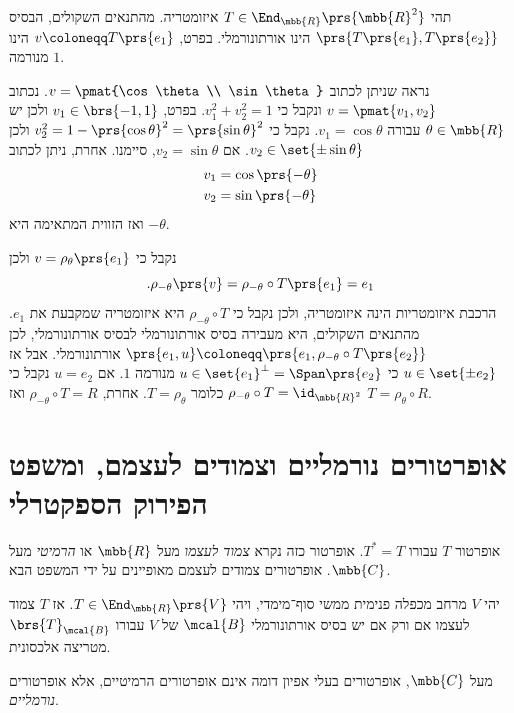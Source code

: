 \documentclass[a4paper,10pt,twoside,openany]{book}
\begin{document}
\begin{solution}
תהי
$T \in \End_{\mbb{R}}\prs{\mbb{R}^2}$
איזומטריה.
מהתנאים השקולים, הבסיס
$\prs{T\prs{e_1}, T\prs{e_2}}$
הינו אורתונורמלי.
בפרט,
$v \coloneqq T\prs{e_1}$
הינו מנורמה
$1$.

נראה שניתן לכתוב
$v = \pmat{\cos\theta \\ \sin\theta}$.
נכתוב
$v = \pmat{v_1, v_2}$
ונקבל כי
$v_1^2 + v_2^2 = 1$.
בפרט,
$v_1 \in \brs{-1,1}$
ולכן יש
$\theta \in \mbb{R}$
עבורה
$v_1 = \cos\theta$.
נקבל כי
$v_2^2 = 1 - \prs{\cos \theta}^2 = \prs{\sin \theta}^2$
ולכן
$v_2 \in \set{\pm \sin \theta}$.
אם
$v_2 = \sin\theta$,
סיימנו.
אחרת, ניתן לכתוב
\begin{align*}
    v_1 &= \cos\prs{-\theta} \\
    v_2 &= \sin\prs{-\theta}
\end{align*}
ואז הזווית המתאימה היא
$-\theta$.

נקבל כי
$v = \rho_\theta\prs{e_1}$
ולכן
\[\text{.} \rho_{-\theta}\prs{v} = \rho_{-\theta} \circ T \prs{e_1} = e_1\]
הרכבת איזומטריות הינה איזומטריה, ולכן נקבל כי
$\rho_{-\theta} \circ T$
היא איזומטריה שמקבעת את
$e_1$.
מהתנאים השקולים, היא מעבירה בסיס אורתונורמלי לבסיס אורתונורמלי, לכן
$\prs{e_1, u} \coloneqq \prs{e_1, \rho_{-\theta} \circ T\prs{e_2}}$
אורתונורמלי.
אבל אז
$u \in \set{\pm e_2}$
כי
$u \in \set{e_1}^\perp = \Span\prs{e_2}$
מנורמה
$1$.
אם
$u = e_2$
נקבל כי
$\rho_{-\theta} \circ T = \id_{\mbb{R}^2}$
כלומר
$T = \rho_{\theta}$.
אחרת,
$\rho_{-\theta} \circ T = R$
ואז
$T = \rho_{\theta} \circ R$.
\end{solution}

\section{אופרטורים נורמליים וצמודים לעצמם, ומשפט הפירוק הספקטרלי}

אופרטור
$T$
עבורו
$T^* = T$.
אופרטור כזה נקרא
\emph{צמוד לעצמו}
מעל
$\mbb{R}$
או
\emph{הרמיטי}
מעל
$\mbb{C}$.
אופרטורים צמודים לעצמם מאופיינים על ידי המשפט הבא.

\begin{theorem}
יהי
$V$
מרחב מכפלה פנימית ממשי סוף־מימדי, ויהי
$T \in \End_{\mbb{R}}\prs{V}$.
אז
$T$
צמוד לעצמו אם ורק אם יש בסיס אורתונורמלי
$\mcal{B}$
של
$V$
עבורו
$\brs{T}_\mcal{B}$
מטריצה אלכסונית.
\end{theorem}

מעל
$\mbb{C}$,
אופרטורים בעלי אפיון דומה אינם אופרטורים הרמיטיים, אלא אופרטורים
\emph{נורמליים}.
\end{document}
